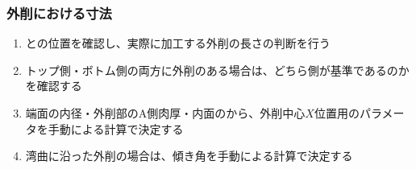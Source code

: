 \subsubsection{外削における寸法}
\begin{enumerate}
\item \OutcutLength と\Keyway の位置を確認し、実際に加工する外削の長さの判断を行う
\item トップ側・ボトム側の両方に外削のある場合は、どちら側が基準であるのかを確認する
\item {}端面の内径・外削部のA側肉厚・内面の\PlatingThk から、外削中心$X$位置用のパラメータを手動による計算で決定する
\item {}湾曲に沿った外削の場合は、傾き角を手動による計算で決定する
\end{enumerate}
